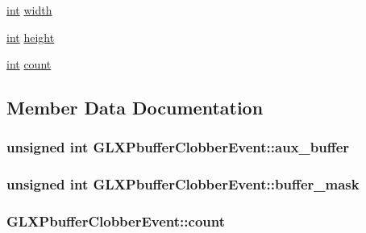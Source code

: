 \begin{DoxyCompactItemize}
\item 
\hyperlink{_s_d_l__thread_8h_a6a64f9be4433e4de6e2f2f548cf3c08e}{int} \hyperlink{struct_g_l_x_pbuffer_clobber_event_aaca375fecb872c73c60cd5d0bfc7c7a5}{width}
\item 
\hyperlink{_s_d_l__thread_8h_a6a64f9be4433e4de6e2f2f548cf3c08e}{int} \hyperlink{struct_g_l_x_pbuffer_clobber_event_aed4e539c896bdad15217bf92c28f8520}{height}
\item 
\hyperlink{_s_d_l__thread_8h_a6a64f9be4433e4de6e2f2f548cf3c08e}{int} \hyperlink{struct_g_l_x_pbuffer_clobber_event_a61e9f6b31738464dca67f909fcacd298}{count}
\end{DoxyCompactItemize}


\subsection{Member Data Documentation}
\hypertarget{struct_g_l_x_pbuffer_clobber_event_a13193b6e7e3e52b15f754fe91403b7ec}{
\subsubsection[{aux\-\_\-buffer}]{\setlength{\rightskip}{0pt plus 5cm}unsigned {\bf int} G\-L\-X\-Pbuffer\-Clobber\-Event\-::aux\-\_\-buffer}}\label{struct_g_l_x_pbuffer_clobber_event_a13193b6e7e3e52b15f754fe91403b7ec}
\hypertarget{struct_g_l_x_pbuffer_clobber_event_aff4c23d00f6dad98427f8d32a5f10580}{
\subsubsection[{buffer\-\_\-mask}]{\setlength{\rightskip}{0pt plus 5cm}unsigned {\bf int} G\-L\-X\-Pbuffer\-Clobber\-Event\-::buffer\-\_\-mask}}\label{struct_g_l_x_pbuffer_clobber_event_aff4c23d00f6dad98427f8d32a5f10580}
\hypertarget{struct_g_l_x_pbuffer_clobber_event_a61e9f6b31738464dca67f909fcacd298}{
\subsubsection[{count}]{ G\-L\-X\-Pbuffer\-Clobber\-Event\-::count}}\label{struct_g_l_x_pbuffer_clobber_event_a61e9f6b31738464dca67f909fcacd298}
